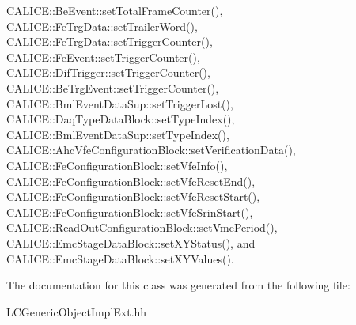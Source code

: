 CALICE::BeEvent::setTotalFrameCounter(), CALICE::FeTrgData::setTrailerWord(), CALICE::FeTrgData::setTriggerCounter(), CALICE::FeEvent::setTriggerCounter(), CALICE::DifTrigger::setTriggerCounter(), CALICE::BeTrgEvent::setTriggerCounter(), CALICE::BmlEventDataSup::setTriggerLost(), CALICE::DaqTypeDataBlock::setTypeIndex(), CALICE::BmlEventDataSup::setTypeIndex(), CALICE::AhcVfeConfigurationBlock::setVerificationData(), CALICE::FeConfigurationBlock::setVfeInfo(), CALICE::FeConfigurationBlock::setVfeResetEnd(), CALICE::FeConfigurationBlock::setVfeResetStart(), CALICE::FeConfigurationBlock::setVfeSrinStart(), CALICE::ReadOutConfigurationBlock::setVmePeriod(), CALICE::EmcStageDataBlock::setXYStatus(), and CALICE::EmcStageDataBlock::setXYValues().

The documentation for this class was generated from the following file:\begin{DoxyCompactItemize}
\item 
LCGenericObjectImplExt.hh\end{DoxyCompactItemize}
